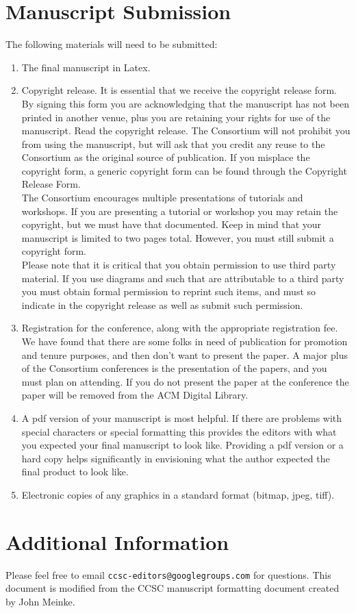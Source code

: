 \documentclass{article}
\begin{document}
\section{Manuscript Submission}
The following materials will need to be submitted:
\begin{enumerate}[noitemsep]
  \item The final manuscript in Latex.
  \item Copyright release. It is essential that we receive the copyright
  release form. By signing this form you are acknowledging that the manuscript
  has not been printed in another venue, plus you are retaining your rights for
  use of the manuscript. Read the copyright release. The Consortium will not
  prohibit you from using the manuscript, but will ask that you credit any reuse
  to the Consortium as the original source of publication. If you misplace the
  copyright form, a generic copyright form can be found through the Copyright
  Release Form\cite{copyright}.\\
  The Consortium encourages multiple presentations of tutorials and workshops.
  If you are presenting a tutorial or workshop you may retain the copyright,
  but we must have that documented. Keep in mind that your manuscript is limited
  to two pages total. However, you must still submit a copyright form.\\
  Please note that it is critical that you obtain permission to use third party
  material. If you use diagrams and such that are attributable to a third party
  you must obtain formal permission to reprint such items, and must so indicate
  in the copyright release as well as submit such permission.
  \item Registration for the conference, along with the appropriate registration
  fee. We have found that there are some folks in need of publication for
  promotion and tenure purposes, and then don’t want to present the paper.
  A major plus of the Consortium conferences is the presentation of the papers,
  and you must plan on attending. If you do not present the paper at the
  conference the paper will be removed from the ACM Digital Library.
  \item A pdf version of your manuscript is most helpful. If there are problems
  with special characters or special formatting this provides the editors with
  what you expected your final manuscript to look like. Providing a pdf version
  or a hard copy helps significantly in envisioning what the author expected
  the final product to look like.
  \item Electronic copies of any graphics in a standard format (bitmap, jpeg, tiff).
\end{enumerate}

\section{Additional Information}
Please feel free to email \verb+ccsc-editors@googlegroups.com+ for questions.
This document is modified from the CCSC manuscript formatting
document\cite{meinke} created by John Meinke.

\medskip

\printbibliography
\end{document}
